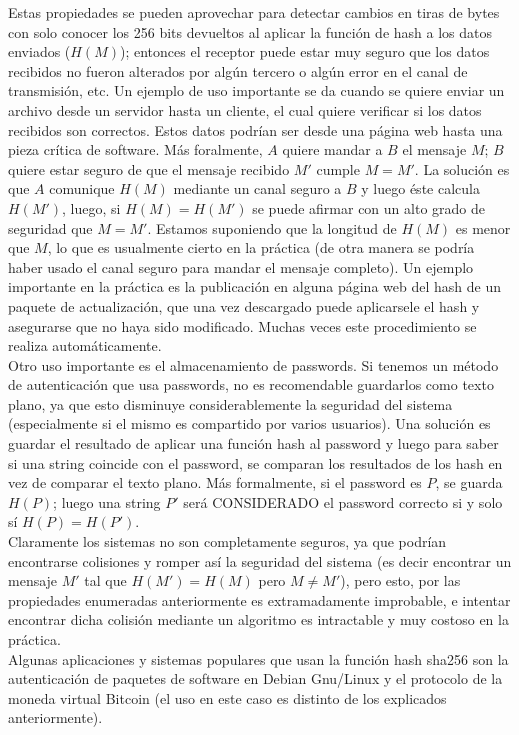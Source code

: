 Estas propiedades se pueden aprovechar para detectar cambios en tiras de bytes con solo conocer los 256 bits devueltos al aplicar la función de hash a los datos enviados ($H(M)$); entonces el receptor puede estar muy seguro que los datos recibidos no fueron alterados por algún tercero o algún error en el canal de transmisión, etc. Un ejemplo de uso importante se da cuando se quiere enviar un archivo desde un servidor hasta un cliente, el cual quiere verificar si los datos recibidos son correctos. Estos datos podrían ser desde una página web hasta una pieza crítica de software. Más foralmente, $A$ quiere mandar a $B$ el mensaje $M$; $B$ quiere estar seguro de que el mensaje recibido $M'$ cumple $M = M'$. La solución es que $A$ comunique $H(M)$ mediante un canal seguro a $B$ y luego éste calcula $H(M')$, luego, si $H(M) = H(M')$ se puede afirmar con un alto grado de seguridad que $M = M'$. Estamos suponiendo que la longitud de $H(M)$ es menor que $M$, lo que es usualmente cierto en la práctica (de otra manera se podría haber usado el canal seguro para mandar el mensaje completo). Un ejemplo importante en la práctica es la publicación en alguna página web del hash de un paquete de actualización, que una vez descargado puede aplicarsele el hash y asegurarse que no haya sido modificado. Muchas veces este procedimiento se realiza automáticamente.  \\
\indent Otro uso importante es el almacenamiento de passwords. Si tenemos un método de autenticación que usa passwords, no es recomendable guardarlos como texto plano, ya que esto disminuye considerablemente la seguridad del sistema (especialmente si el mismo es compartido por varios usuarios). Una solución es guardar el resultado de aplicar una función hash al password y luego para saber si una string coincide con el password, se comparan los resultados de los hash en vez de comparar el texto plano. Más formalmente, si el password es $P$, se guarda $H(P)$; luego una string $P'$ será CONSIDERADO el password correcto si y solo sí $H(P) = H(P')$.\\
\indent Claramente los sistemas no son completamente seguros, ya que podrían encontrarse colisiones y romper así la seguridad del sistema (es decir encontrar un mensaje $M'$ tal que $H(M') = H(M)$ pero $M \neq M'$), pero esto, por las propiedades enumeradas anteriormente es extramadamente improbable, e intentar encontrar dicha colisión mediante un algoritmo es intractable y muy costoso en la práctica. \\

Algunas aplicaciones y sistemas populares que usan la función hash sha256 son la autenticación de paquetes de software en Debian Gnu/Linux y el protocolo de la moneda virtual Bitcoin (el uso en este caso es distinto de los explicados anteriormente).  \\

